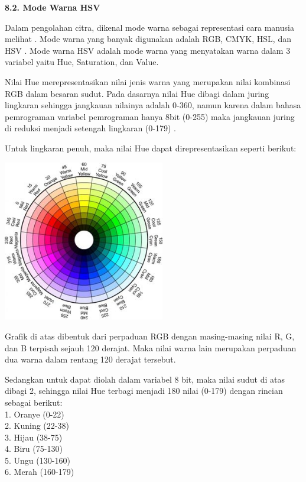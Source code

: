 \documentclass[a4paper,12pt]{article}
\begin{document}
\indent \textbf{8.2. \hspace{8pt} Mode Warna HSV}

Dalam pengolahan citra, dikenal mode warna sebagai representasi cara manusia melihat \cite{robot} . 
Mode warna yang banyak digunakan adalah RGB, CMYK, HSL, dan HSV \cite{improc1}. 
Mode warna HSV adalah mode warna yang menyatakan warna dalam 3 variabel yaitu Hue, Saturation, dan Value.

Nilai Hue merepresentasikan nilai jenis warna yang merupakan nilai kombinasi RGB dalam besaran sudut. 
Pada dasarnya nilai Hue dibagi dalam juring lingkaran sehingga jangkauan nilainya adalah 0-360, namun karena dalam bahasa pemrograman variabel pemrograman hanya 8bit (0-255) maka jangkauan juring di reduksi menjadi setengah lingkaran (0-179) \cite{opencv_intro}.

Untuk lingkaran penuh, maka nilai Hue dapat direpresentasikan seperti berikut:
\begin{center}
 \includegraphics[width=200pt]{HSV}
\end{center}

Grafik di atas dibentuk dari perpaduan RGB dengan masing-masing nilai R, G, dan B terpisah sejauh 120 derajat.
Maka nilai warna lain merupakan perpaduan dua warna dalam rentang 120 derajat tersebut.

Sedangkan untuk dapat diolah dalam variabel 8 bit, maka nilai sudut di atas dibagi 2, sehingga nilai Hue terbagi menjadi 180 nilai (0-179) dengan rincian sebagai berikut:\\
1. Oranye (0-22)\\
2. Kuning (22-38)\\
3. Hijau (38-75)\\
4. Biru (75-130)\\
5. Ungu (130-160)\\
6. Merah (160-179)
\end{document}
